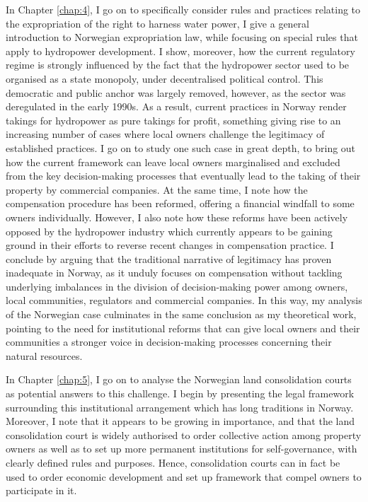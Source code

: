 In Chapter \ref{chap:4}, I go on to specifically consider rules and practices relating to the expropriation of the right to harness water power, I give a general introduction to Norwegian expropriation law, while focusing on special rules that apply to hydropower development. I show, moreover, how the current regulatory regime is strongly influenced by the fact that the hydropower sector used to be organised as a state monopoly, under decentralised political control. This democratic and public anchor was largely removed, however, as the sector was deregulated in the early 1990s. As a result, current practices in Norway render takings for hydropower as pure takings for profit, something giving rise to an increasing number of cases where local owners challenge the legitimacy of established practices. I go on to study one such case in great depth, to bring out how the current framework can leave local owners marginalised and excluded from the key decision-making processes that eventually lead to the taking of their property by commercial companies. At the same time, I note how the compensation procedure has been reformed, offering a financial windfall to some owners individually. However, I also note how these reforms have been actively opposed by the hydropower industry which currently appears to be gaining ground in their efforts to reverse recent changes in compensation practice. I conclude by arguing that the traditional narrative of legitimacy has proven inadequate in Norway, as it unduly focuses on compensation without tackling underlying imbalances in the division of decision-making power among owners, local communities, regulators and commercial companies. In this way, my analysis of the Norwegian case culminates in the same conclusion as my theoretical work, pointing to the need for institutional reforms that can give local owners and their communities a stronger voice in decision-making processes concerning their natural resources.

In Chapter \ref{chap:5}, I go on to analyse the Norwegian land consolidation courts as potential answers to this challenge. I begin by presenting the legal framework surrounding this institutional arrangement which has long traditions in Norway. Moreover, I note that it appears to be growing in importance, and that the land consolidation court is widely authorised to order collective action among property owners as well as to set up more permanent institutions for self-governance, with clearly defined rules and purposes. Hence, consolidation courts can in fact be used to order economic development and set up framework that compel owners to participate in it. 

